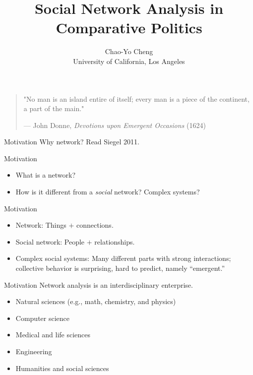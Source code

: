 \documentclass[10pt]{beamer}
\title{Social Network Analysis in Comparative Politics}
\author{Chao-Yo Cheng \\ University of California, Los Angeles}
\begin{document}
\maketitle

\begin{frame}%
\begin{quotation}
\noindent "No man is an island entire of itself; every man is a piece of the continent, a part of the main."\\
\vspace*{0.1cm}
\begin{footnotesize}
--- John Donne, \textit{Devotions upon Emergent Occasions} (1624)
\end{footnotesize}
\end{quotation}

\end{frame}

\begin{frame}{Motivation}
Why network? Read Siegel 2011.
\end{frame}

\begin{frame}{Motivation}
	\begin{itemize}
		\item What is a network?
		\item How is it different from a \textit{social} network? Complex systems?
	\end{itemize}
\end{frame}

\begin{frame}{Motivation}
	\begin{itemize}
		\item Network: Things $+$ connections.
		
		\item Social network: People $+$ relationships.
		
		\item Complex social systems: Many different parts with strong interactions; collective behavior is surprising, hard to predict, namely ``emergent.''
	\end{itemize}
\end{frame}

\begin{frame}{Motivation}
Network analysis is an interdisciplinary enterprise.
	\begin{itemize}
		\item Natural sciences (e.g., math, chemistry, and physics)
		\item Computer science
		\item Medical and life sciences
		\item Engineering
		\item Humanities and social sciences
	\end{itemize}
\end{frame}
\end{document}
